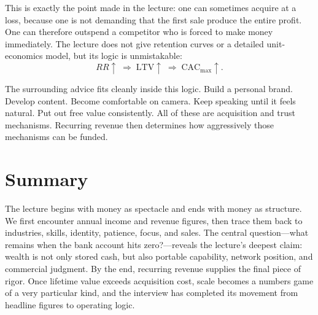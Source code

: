 This is exactly the point made in the lecture: one can sometimes acquire at a loss, because one is not demanding that the first sale produce the entire profit. One can therefore outspend a competitor who is forced to make money immediately. The lecture does not give retention curves or a detailed unit-economics model, but its logic is unmistakable:
\begin{equation}
RR \uparrow
\;\Longrightarrow\;
\mathrm{LTV} \uparrow
\;\Longrightarrow\;
\mathrm{CAC}_{\max} \uparrow.
\end{equation}

The surrounding advice fits cleanly inside this logic. Build a personal brand. Develop content. Become comfortable on camera. Keep speaking until it feels natural. Put out free value consistently. All of these are acquisition and trust mechanisms. Recurring revenue then determines how aggressively those mechanisms can be funded.

\section{Summary}

The lecture begins with money as spectacle and ends with money as structure. We first encounter annual income and revenue figures, then trace them back to industries, skills, identity, patience, focus, and sales. The central question---what remains when the bank account hits zero?---reveals the lecture's deepest claim: wealth is not only stored cash, but also portable capability, network position, and commercial judgment. By the end, recurring revenue supplies the final piece of rigor. Once lifetime value exceeds acquisition cost, scale becomes a numbers game of a very particular kind, and the interview has completed its movement from headline figures to operating logic.